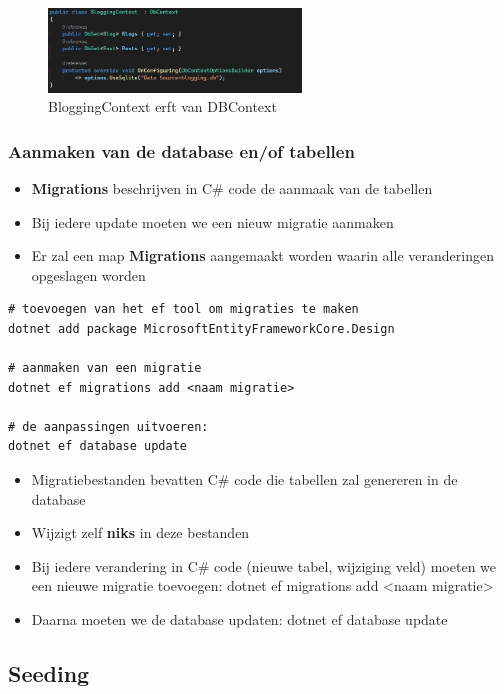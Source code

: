 \documentclass{article}
\begin{document}
\begin{figure}[H]
    \centering
    \includegraphics[width=0.6\textwidth]{efcore-dbcontext.png}
    \caption{BloggingContext erft van DBContext}
\end{figure}

\subsubsection{Aanmaken van de database en/of tabellen}

\begin{itemize}
    \item \textbf{Migrations} beschrijven in C\# code de aanmaak van de tabellen
    \item Bij iedere update moeten we een nieuw migratie aanmaken
    \item Er zal een map \textbf{Migrations} aangemaakt worden waarin alle veranderingen opgeslagen worden
\end{itemize}

\begin{verbatim}
# toevoegen van het ef tool om migraties te maken
dotnet add package MicrosoftEntityFrameworkCore.Design

# aanmaken van een migratie
dotnet ef migrations add <naam migratie>

# de aanpassingen uitvoeren:
dotnet ef database update
\end{verbatim}

\begin{itemize}
    \item Migratiebestanden bevatten C\# code die tabellen zal genereren in de database
    \item Wijzigt zelf \textbf{niks} in deze bestanden
    \item Bij iedere verandering in C\# code (nieuwe tabel, wijziging veld) moeten we een nieuwe migratie toevoegen: dotnet ef migrations add <naam migratie>
    \item Daarna moeten we de database updaten: dotnet ef database update
\end{itemize}

\subsection{Seeding}
\end{document}
